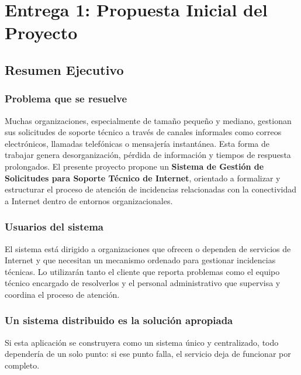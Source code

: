 \documentclass[12pt, a4paper]{report}
\begin{document}
\tableofcontents
\newpage

\chapter*{Entrega 1: Propuesta Inicial del Proyecto}

\section*{Resumen Ejecutivo}

\subsection*{Problema que se resuelve}

Muchas organizaciones, especialmente de tamaño pequeño y mediano, gestionan
sus solicitudes de soporte técnico a través de canales informales como correos
electrónicos, llamadas telefónicas o mensajería instantánea. Esta forma de
trabajar genera desorganización, pérdida de información y tiempos de respuesta
prolongados. El presente proyecto propone un \textbf{Sistema de Gestión de
Solicitudes para Soporte Técnico de Internet}, orientado a formalizar y
estructurar el proceso de atención de incidencias relacionadas con la
conectividad a Internet dentro de entornos organizacionales.

\vspace{0.5cm}

\subsection*{Usuarios del sistema}

El sistema está dirigido a organizaciones que ofrecen o dependen de servicios
de Internet y que necesitan un mecanismo ordenado para gestionar incidencias
técnicas. Lo utilizarán tanto el cliente que reporta problemas como el equipo
técnico encargado de resolverlos y el personal administrativo que supervisa y
coordina el proceso de atención.

\vspace{0.5cm}

\subsection*{Un sistema distribuido es la solución apropiada}

Si esta aplicación se construyera como un sistema único y centralizado,
todo dependería de un solo punto: si ese punto falla, el servicio deja de
funcionar por completo.
\end{document}
